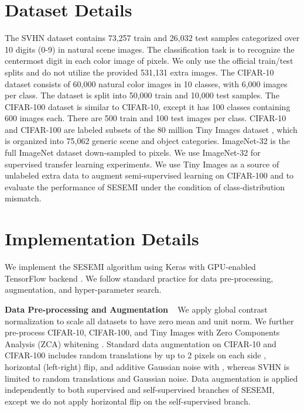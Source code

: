 \documentclass{article}
\begin{document}
\section{Dataset Details}\label{datasets}
The SVHN \cite{svhn} dataset contains 73,257 train and 26,032 test samples categorized over 10 digits (0-9) in natural scene images. The classification task is to recognize the centermost digit in each color image of  pixels. We only use the official train/test splits and do not utilize the provided 531,131 extra images. The CIFAR-10 \cite{cifar} dataset consists of 60,000  natural color images in 10 classes, with 6,000 images per class. The dataset is split into 50,000 train and 10,000 test samples. The CIFAR-100 \cite{cifar} dataset is similar to CIFAR-10, except it has 100 classes containing 600 images each. There are 500 train and 100 test images per class. CIFAR-10 and CIFAR-100 are labeled subsets of the 80 million Tiny Images dataset \cite{tiny-images}, which is organized into 75,062 generic scene and object categories. ImageNet-32 \cite{tiny-imagenet} is the full ImageNet dataset \cite{imagenet} down-sampled to  pixels. We use ImageNet-32 for supervised transfer learning experiments. We use Tiny Images as a source of unlabeled extra data to augment semi-supervised learning on CIFAR-100 and to evaluate the performance of SESEMI under the condition of class-distribution mismatch.

\section{Implementation Details}\label{implementation}
We implement the SESEMI algorithm using Keras \cite{keras} with GPU-enabled TensorFlow backend \cite{tf}. We follow standard practice for data pre-processing, augmentation, and hyper-parameter search.

\textbf{Data Pre-processing and Augmentation} ~ We apply global contrast normalization to scale all datasets to have zero mean and unit  norm. We further pre-process CIFAR-10, CIFAR-100, and Tiny Images with Zero Components Analysis (ZCA) whitening \cite{cifar}. Standard data augmentation on CIFAR-10 and CIFAR-100 includes random translations by up to 2 pixels on each side , horizontal (left-right) flip, and additive Gaussian noise with , whereas SVHN is limited to random translations and Gaussian noise. Data augmentation is applied independently to both supervised and self-supervised branches of SESEMI, except we do not apply horizontal flip on the self-supervised branch.
\end{document}

